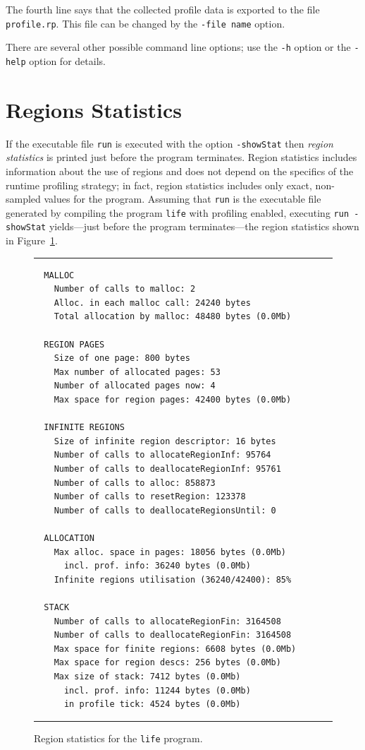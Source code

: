 \documentclass[12pt]{book}
\begin{document}
The fourth line says that the collected profile data is exported to
the file \texttt{profile.rp}. This file can be changed by the 
%
\texttt{-file name} option.

There are several other possible command line options; use the \texttt{-h} option or the 
%
\texttt{-help} option for details.

\section{Regions Statistics}
If the executable file {\tt run} is executed with the option {\tt -showStat} then
%
{\em region statistics\/} is printed just before the program
terminates. Region statistics includes information about the use of
regions and does not depend on the specifics of the runtime
profiling strategy; in fact, region statistics includes only exact,
non-sampled values for the program. Assuming that {\tt run} is the
executable file generated by compiling the program {\tt life} with
profiling enabled, executing {\tt run -showStat} yields---just before
the program terminates---the region statistics shown in
Figure~\ref{region_statistics.fig}.
\begin{figure}
\hrule \medskip
\begin{verbatim}
  MALLOC
    Number of calls to malloc: 2
    Alloc. in each malloc call: 24240 bytes
    Total allocation by malloc: 48480 bytes (0.0Mb)

  REGION PAGES
    Size of one page: 800 bytes
    Max number of allocated pages: 53
    Number of allocated pages now: 4
    Max space for region pages: 42400 bytes (0.0Mb)

  INFINITE REGIONS
    Size of infinite region descriptor: 16 bytes
    Number of calls to allocateRegionInf: 95764
    Number of calls to deallocateRegionInf: 95761
    Number of calls to alloc: 858873
    Number of calls to resetRegion: 123378
    Number of calls to deallocateRegionsUntil: 0

  ALLOCATION
    Max alloc. space in pages: 18056 bytes (0.0Mb)
      incl. prof. info: 36240 bytes (0.0Mb)
    Infinite regions utilisation (36240/42400): 85%

  STACK
    Number of calls to allocateRegionFin: 3164508
    Number of calls to deallocateRegionFin: 3164508
    Max space for finite regions: 6608 bytes (0.0Mb)
    Max space for region descs: 256 bytes (0.0Mb)
    Max size of stack: 7412 bytes (0.0Mb)
      incl. prof. info: 11244 bytes (0.0Mb)
      in profile tick: 4524 bytes (0.0Mb)
\end{verbatim}
\caption{Region statistics for the {\tt life} program.}
\label{region_statistics.fig}
\medskip\hrule
\end{figure}
\end{document}
